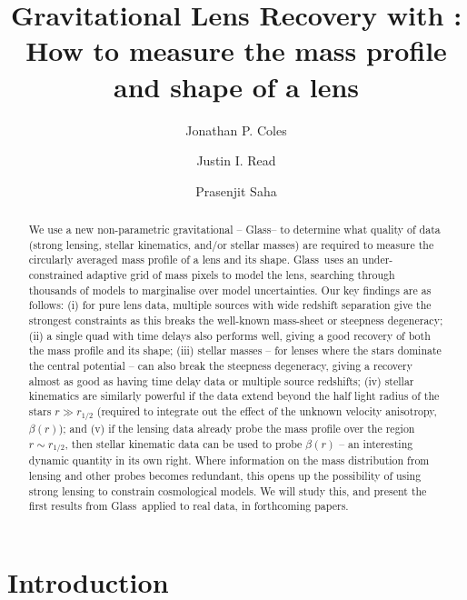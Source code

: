 \documentclass[galley,usenatbib]{mn2e}
\title[\Glass]{Gravitational Lens Recovery with \Glass: How to measure the mass profile and shape of a lens}
\author{%
Jonathan P. Coles 
\and 
Justin I. Read
\and 
Prasenjit Saha 
}
\newcommand{\Glass}{{\sc Glass}}
\begin{document}
\maketitle

\begin{abstract}
We use a new non-parametric gravitational -- \Glass -- to determine what quality of data (strong lensing, stellar kinematics, and/or stellar masses) are required to measure the circularly averaged mass profile of a lens and its shape. \Glass\ uses an under-constrained adaptive grid of mass pixels to model the lens, searching through thousands of models to marginalise over model uncertainties. Our key findings are as follows: (i) for pure lens data, multiple sources with wide redshift separation give the strongest constraints as this breaks the well-known mass-sheet or steepness degeneracy; (ii) a single quad with time delays also performs well, giving a good recovery of both the mass profile and its shape; (iii) stellar masses -- for lenses where the stars dominate the central potential -- can also break the steepness degeneracy, giving a recovery almost as good as having time delay data or multiple source redshifts; (iv) stellar kinematics are similarly powerful if the data extend beyond the half light radius of the stars $r \gg r_{1/2}$ (required to integrate out the effect of the unknown velocity anisotropy, $\beta(r)$); and (v) if the lensing data already probe the mass profile over the region $r \sim r_{1/2}$, then stellar kinematic data can be used to probe $\beta(r)$ -- an interesting dynamic quantity in its own right. Where information on the mass distribution from lensing and other probes becomes redundant, this opens up the possibility of using strong lensing to constrain cosmological models. We will study this, and present the first results from \Glass\ applied to real data, in forthcoming papers.
\end{abstract}


\section{Introduction}\label{sec:intro} %
\end{document}

